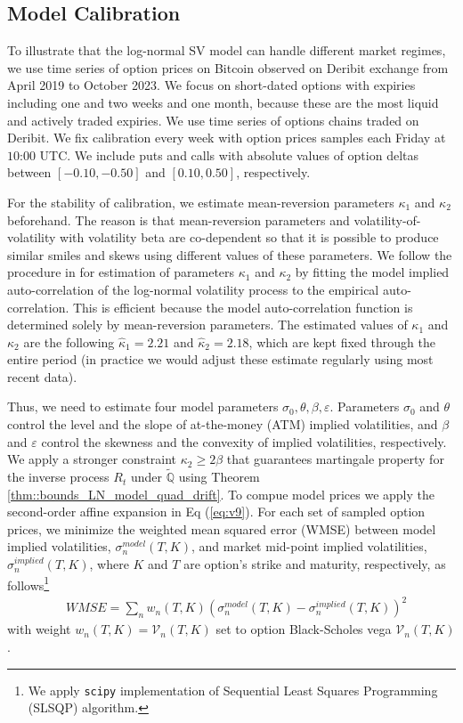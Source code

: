 \documentclass[pdftex,11pt,a4paper] {article}
\begin{document}
\subsection{Model Calibration}\label{sec:kappa2calib}

To illustrate that the log-normal SV model can handle different market regimes, we use  time series of option prices on Bitcoin observed on Deribit exchange from April 2019 to October 2023. We focus on short-dated options with expiries including one and two weeks and one month, because these are the most liquid and actively traded expiries. We use time series of options chains  traded on Deribit. We fix calibration every week with option prices samples each Friday at $10$:$00$ UTC. We include puts and calls with absolute values of option deltas between $[-0.10, -0.50]$ and $[0.10, 0.50]$, respectively.


For the stability of calibration, we estimate mean-reversion parameters $\kappa_{1}$ and $\kappa_{2}$ beforehand. The reason is that mean-reversion parameters and volatility-of-volatility with volatility beta are co-dependent so that it is possible to produce similar smiles and skews using different values of these parameters. We follow the procedure in \cite{SeppRakhmonov2023} for estimation of parameters $\kappa_{1}$ and $\kappa_{2}$ by fitting the model implied auto-correlation of the log-normal volatility process to the empirical auto-correlation. This is efficient because the model auto-correlation function is determined solely by mean-reversion parameters. The estimated values of $\kappa_{1}$ and $\kappa_{2}$ are the following $\hat{\kappa}_{1}=2.21$ and $\hat{\kappa}_{2}=2.18$, which are kept fixed through the entire period (in practice we would adjust these estimate regularly using most recent data).

Thus, we need to estimate four model parameters $\sigma_{0}, \theta, \beta, \varepsilon$. Parameters $\sigma_{0}$ and $\theta$ control the level and the slope of at-the-money (ATM) implied volatilities, and $\beta$ and $\varepsilon$ control the skewness and the convexity of implied volatilities, respectively. We apply a stronger constraint $\kappa_2\ge 2\beta$ that guarantees martingale property for the inverse process $R_t$ under $\tilde{\mathbb{Q}}$ using Theorem \ref{thm::bounds_LN_model_quad_drift}. To compue model prices we apply the second-order affine expansion in Eq (\ref{eq:v9}). For each set of sampled option prices, we minimize the weighted mean squared error (WMSE) between model implied volatilities, $\sigma^{model}_{n}(T,K)$, and market mid-point implied volatilities, $\sigma^{implied}_{n}(T,K)$, where $K$ and $T$ are option's strike and maturity, respectively, as follows\footnote{We apply {\tt scipy} implementation of Sequential Least Squares Programming (SLSQP) algorithm.} 
\begin{equation} \label{eq:mf1}
\begin{split}
& WMSE = \sum_{n} w_{n}(T,K)\left( \sigma^{model}_{n}(T,K) - \sigma^{implied}_{n}(T,K)  \right) ^{2}
\end{split}
\end{equation}
with weight $w_{n}(T,K)=\mathcal{V}_{n}(T,K)$ set to option Black-Scholes vega $\mathcal{V}_{n}(T,K)$.
\end{document}
